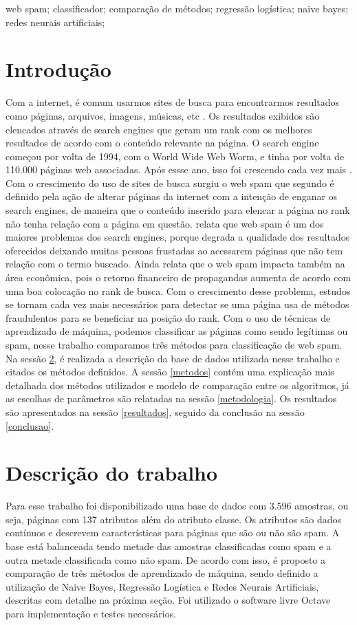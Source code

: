 \documentclass[10pt, conference, compsocconf]{IEEEtran}
\begin{document}
\begin{IEEEkeywords}
web spam; classificador; comparação de métodos; regressão logística; naive bayes; redes neurais artificiais;
\end{IEEEkeywords}

\section{Introdução} 
Com a internet, é comum usarmos sites de busca para encontrarmos resultados como páginas, arquivos, imagens, músicas, etc . Os resultados exibidos são elencados através de search engines que geram um rank com os melhores resultados de acordo com o conteúdo relevante na página. O search engine começou por volta de 1994, com o World Wide Web Worm, e tinha por volta de 110.000 páginas web associadas. Após essse ano, isso foi crescendo cada vez mais \cite{1}.
Com o crescimento do uso de sites de busca surgiu o web spam que segundo \cite{2} é definido pela ação de alterar páginas da internet com a intenção de enganar os search engines, de maneira que o conteúdo inserido para elencar a página no rank não tenha relação com a página em questão.
\cite{3} relata que web spam é um dos maiores problemas dos search engines, porque degrada a qualidade dos resultados oferecidos deixando muitas pessoas frustadas ao acessarem páginas que não tem relação com o termo buscado. Ainda relata que o web spam impacta também na área econômica, pois o retorno financeiro de propagandas aumenta de acordo com uma boa colocação no rank de busca.
Com o crescimento desse problema, estudos se tornam cada vez mais necessários para detectar se uma página usa de métodos fraudulentos para se beneficiar na posição do rank. Com o uso de técnicas de aprendizado de máquina, podemos classificar as páginas como sendo legítimas ou spam, nesse trabalho comparamos três métodos para classificação de web spam.
Na sessão \ref{descricao}, é realizada a descrição da base de dados utilizada nesse trabalho e citados os métodos definidos. A sessão \ref{metodos} contém uma explicação mais detalhada dos métodos utilizados e modelo de comparação entre os algoritmos, já as escolhas de parâmetros são relatadas na sessão \ref{metodologia}. Os resultados são apresentados na sessão \ref{resultados}, seguido da conclusão na sessão \ref{conclusao}.

\section{Descrição do trabalho}\label{descricao} 
Para esse trabalho foi disponibilizado uma base de dados com 3.596 amostras, ou seja, páginas com 137 atributos além do atributo classe. Os atributos são dados contínuos e  descrevem características para páginas que são ou não são spam. A base está balanceada tendo metade das amostras classificadas como spam e a outra metade classificada como não spam.
De acordo com isso, é proposto a comparação de três métodos de aprendizado de máquina, sendo definido a utilização de Naive Bayes, Regressão Logística e Redes Neurais Artificiais, descritas com detalhe na próxima seção.
Foi utilizado o software livre Octave para implementação e testes necessários.
\end{document}
